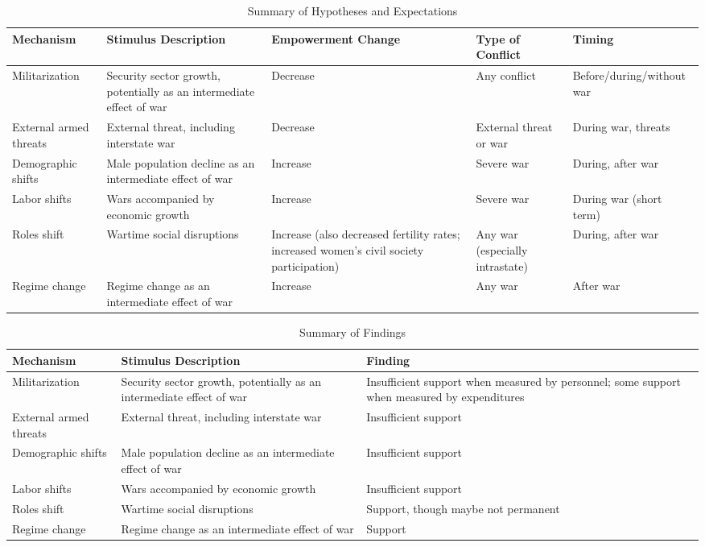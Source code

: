 \documentclass [12pt] {article}
\renewcommand{\footnotesize}{\scriptsize} %
\begin{document}
\begin{table}[h]
\caption{Summary of Hypotheses and Expectations}
\label{hypothesis}
	{\footnotesize 
\begin{tabular}{ |p{3cm}||p{3cm}|p{3cm}|p{3cm}|p{3cm}|  }
	\hline
	\hline
\textbf{Mechanism} & \textbf{Stimulus Description} & \textbf{Empowerment Change} & \textbf{Type of Conflict}& \textbf{Timing}\\
	\hline
	
	Militarization       & Security sector growth, potentially as an intermediate effect of war & Decrease &   Any conflict & Before/during/without war\\
	\hline
	External armed threats   & External threat, including interstate war &  Decrease   & External threat or war & During war, threats\\
	\hline
	Demographic shifts  & Male population decline as an intermediate effect of war & Increase &  Severe war & During, after war\\
	\hline
	Labor shifts    & Wars accompanied by economic growth & Increase &  Severe war & During war (short term)\\
	\hline
	Roles shift   & Wartime social disruptions &   Increase (also decreased fertility rates; increased women's civil society participation) & Any war (especially intrastate) & During, after war \\
	\hline
	Regime change   & Regime change as an intermediate effect of war  & Increase  & Any war & After war\\
	\hline
\end{tabular}
}
\end{table}


\begin{table}[h]
\caption{Summary of Findings}
\label{results}
	{\footnotesize 
\begin{tabular}{ |p{3cm}||p{6cm}|p{6cm} }
	\hline
	\hline
\textbf{Mechanism} & \textbf{Stimulus Description} & \textbf{Finding} \\
	\hline
	
	Militarization       & Security sector growth, potentially as an intermediate effect of war & Insufficient support when measured by personnel; some support when measured by expenditures\\
	\hline
	External armed threats   & External threat, including interstate war &  Insufficient support\\
	\hline
	Demographic shifts  & Male population decline as an intermediate effect of war & Insufficient support\\
	\hline
	Labor shifts    & Wars accompanied by economic growth & Insufficient support\\
	\hline
	Roles shift   & Wartime social disruptions &   Support, though maybe not permanent\\
	\hline
	Regime change   & Regime change as an intermediate effect of war  & Support\\
	\hline
\end{tabular}
}
\end{table}
\end{document}

